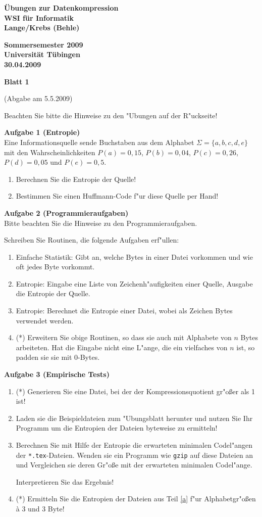 \documentclass[a4paper]{article}
\def\header#1#2#3#4{\pagestyle{empty}
\noindent
\begin{minipage}[t]{0.6\textwidth}
\begin{flushleft}
\bf \"Ubungen zur Datenkompression\\
WSI f\"ur Informatik\\
Lange/Krebs (Behle)
\end{flushleft}
\end{minipage}
\begin{minipage}[t]{0.4\textwidth}
\begin{flushright}
\bf Sommersemester 2009\\
Universit\"at T\"ubingen\\
#2 %
\end{flushright}
\end{minipage}

\begin{center}
{\Large\bf Blatt #1}

{(Abgabe am #3)}
\end{center}
}
\begin{document}
\header{1}{30.04.2009}{5.5.2009}{}

Beachten Sie bitte die Hinweise zu den "Ubungen auf der R"uckseite!

\bigskip

{\bf Aufgabe 1  \quad(Entropie)}\\
Eine Informationsquelle sende Buchstaben aus dem Alphabet $\Sigma=\{a,b,c,d,e\}$ mit den Wahrscheinlichkeiten $P(a)=0,15$, $P(b)=0,04$, $P(c)=0,26$, $P(d)=0,05$ und $P(e)=0,5$.
\begin{enumerate}
\item Berechnen Sie die Entropie der Quelle!
\item Bestimmen Sie einen Huffmann-Code f"ur diese Quelle per Hand!
\end{enumerate}

\bigskip

{\bf Aufgabe 2  \quad(Programmieraufgaben)}\\
Bitte beachten Sie die Hinweise zu den Programmieraufgaben.

\smallskip
Schreiben Sie Routinen, die folgende Aufgaben erf"ullen:
\begin{enumerate}
\item Einfache Statistik: Gibt an, welche Bytes in einer Datei vorkommen und wie oft jedes Byte vorkommt.
\item Entropie: Eingabe eine Liste von Zeichenh"aufigkeiten einer Quelle, Ausgabe die Entropie der Quelle.
\item Entropie: Berechnet die Entropie einer Datei, wobei als Zeichen Bytes verwendet werden.
\item(*) Erweitern Sie obige Routinen, so dass sie auch mit Alphabete von $n$ Bytes arbeiteten. Hat die Eingabe nicht eine L"ange, die ein vielfaches von $n$ ist, so padden sie sie mit 0-Bytes.
\end{enumerate}


\bigskip

{\bf Aufgabe 3  \quad(Empirische Tests)}\\
\begin{enumerate}
\item(*) Generieren Sie eine Datei, bei der der Kompressionsquotient gr"o{\ss}er als 1 ist!
\item\label{a} Laden sie die Beispieldateien zum "Ubungsblatt herunter und nutzen Sie Ihr Programm um die Entropien der Dateien byteweise zu ermitteln!
\item Berechnen Sie mit Hilfe der Entropie die erwarteten minimalen Codel"angen der \verb$*.tex$-Dateien. Wenden sie ein Programm wie \verb$gzip$ auf diese Dateien an und Vergleichen sie deren Gr"o{\ss}e mit der erwarteten minimalen Codel"ange.

Interpretieren Sie das Ergebnis!
\item(*) Ermitteln Sie die Entropien der Dateien aus Teil \ref{a} f"ur Alphabetgr"o{\ss}en \`a 3 und 3 Byte!
\end{enumerate}
\end{document}
